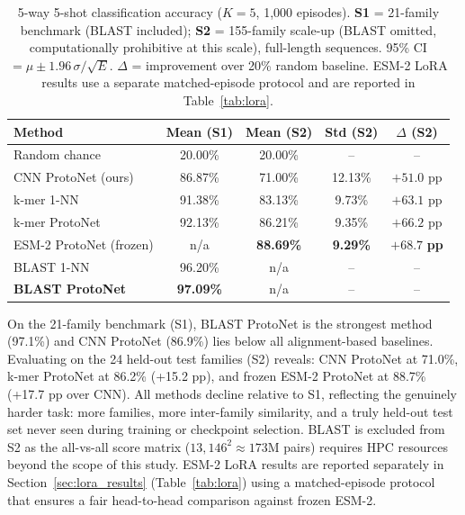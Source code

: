 \documentclass[11pt,a4paper]{article}
\begin{document}
\begin{table}[H]
\centering
\caption{5-way 5-shot classification accuracy ($K=5$, 1{,}000 episodes).
         \textbf{S1} = 21-family benchmark (BLAST included);
         \textbf{S2} = 155-family scale-up (BLAST omitted, computationally
         prohibitive at this scale), full-length sequences.
         95\% CI $= \mu \pm 1.96\,\sigma/\!\sqrt{E}$.
         $\Delta$ = improvement over 20\% random baseline.
         ESM-2 LoRA results use a separate matched-episode protocol
         and are reported in Table~\ref{tab:lora}.}
\label{tab:main_results}
\small
\begin{tabular}{lcccc}
\toprule
\textbf{Method} & \textbf{Mean (S1)} & \textbf{Mean (S2)} & \textbf{Std (S2)} & \textbf{$\Delta$ (S2)} \\
\midrule
Random chance           & 20.00\% & 20.00\% & --     & -- \\
CNN ProtoNet (ours)     & 86.87\% & 71.00\% & 12.13\% & $+51.0$ pp \\
k-mer 1-NN              & 91.38\% & 83.13\% &  9.73\% & $+63.1$ pp \\
k-mer ProtoNet          & 92.13\% & 86.21\% &  9.35\% & $+66.2$ pp \\
ESM-2 ProtoNet (frozen) & n/a     & \textbf{88.69\%} & \textbf{9.29\%} & $\mathbf{+68.7}$ \textbf{pp} \\
BLAST 1-NN              & 96.20\% & n/a     & --     & -- \\
\textbf{BLAST ProtoNet} & \textbf{97.09\%} & n/a & -- & -- \\
\bottomrule
\end{tabular}
\end{table}

On the 21-family benchmark (S1), BLAST ProtoNet is the strongest method (97.1\%)
and CNN ProtoNet (86.9\%) lies below all alignment-based baselines.  Evaluating
on the 24 held-out test families (S2) reveals: CNN ProtoNet at 71.0\%,
k-mer ProtoNet at 86.2\% (+15.2 pp), and frozen ESM-2 ProtoNet at 88.7\%
(+17.7 pp over CNN).  All methods decline relative to S1, reflecting the
genuinely harder task: more families, more inter-family similarity, and a
truly held-out test set never seen during training or checkpoint selection.
BLAST is excluded from S2 as the all-vs-all score matrix
($13{,}146^2 \approx 173\text{M}$ pairs) requires HPC resources beyond the scope
of this study.  ESM-2 LoRA results are reported separately in
Section~\ref{sec:lora_results} (Table~\ref{tab:lora}) using a matched-episode
protocol that ensures a fair head-to-head comparison against frozen ESM-2.
\end{document}
